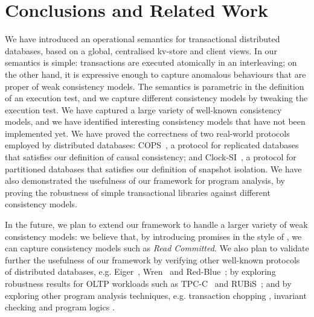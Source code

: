 \section{Conclusions and Related Work}
\label{sec:conclusions}
We have introduced  an  operational semantics for 
transactional distributed databases, based on a global, centralised 
kv-store and client views. 
In our semantics is simple: transactions are executed atomically in an interleaving; on the other hand, it 
is  expressive enough to capture anomalous behaviours that are proper of weak consistency models. 
The semantics is parametric in the definition of an execution test, and we capture different consistency 
models by tweaking the execution test. We have captured a large variety of well-known consistency 
models, 
and we have identified interesting consistency models that have not been 
implemented yet.
We have proved the correctness of two real-world protocols employed by distributed 
databases: COPS~\cite{cops}, a 
protocol for replicated databases that satisfies our definition of causal consistency;
and Clock-SI~\cite{clocksi}, a protocol for partitioned databases that satisfies our
definition of snapshot isolation. We have also demonstrated the usefulness of our framework
for program analysis, by proving the robustness of simple transactional 
libraries against different consistency models. 

In the future, we plan to extend our framework to handle a larger variety 
of weak consistency models: we believe that, by introducing promises 
in the style of \cite{promises}, we can capture  consistency models such 
as \emph{Read Committed}. We also plan to validate further the usefulness of our framework
by verifying other well-known protocols of 
distributed databases, e.g. Eiger~\cite{eiger}, Wren~\cite{wren} and
Red-Blue~\cite{redblue}; by exploring robustness results for OLTP
workloads  such as TPC-C~\cite{tpcc} and RUBiS~\cite{rubis}; 
and by exploring other program analysis techniques, e.g. 
transaction chopping \cite{chopping,psi-chopping}, invariant checking 
\cite{cise,repliss} and program logics \cite{alonetogether}. 

